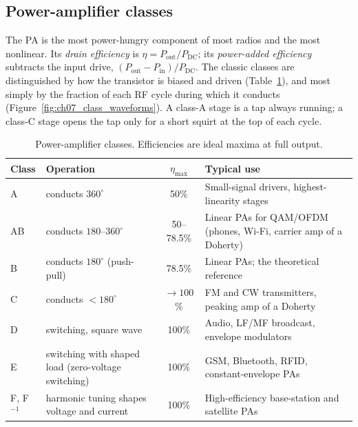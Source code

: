 
\subsection{Power-amplifier classes}

The PA is the most power-hungry component of most radios and the most nonlinear. Its \emph{drain
efficiency} is $\eta=P_{\text{out}}/P_{\text{DC}}$; its \emph{power-added efficiency} subtracts the input
drive, $(P_{\text{out}}-P_{\text{in}})/P_{\text{DC}}$. The classic classes are distinguished by how the
transistor is biased and driven (Table~\ref{tab:ch07:paclasses}), and most simply by the fraction of
each RF cycle during which it conducts (Figure~\ref{fig:ch07_class_waveforms}). A class-A stage is a
tap always running; a class-C stage opens the tap only for a short squirt at the top of each cycle.


\begin{table}[htbp]\centering\small
\caption{Power-amplifier classes. Efficiencies are ideal maxima at full output.}
\label{tab:ch07:paclasses}
\begin{tabular}{l>{\raggedright\arraybackslash}p{2.5cm}c>{\raggedright\arraybackslash}p{5.6cm}}
\toprule
Class & Operation & $\eta_{\max}$ & Typical use \\
\midrule
A & conducts $360^\circ$ & 50\% & Small-signal drivers, highest-linearity stages \\
AB & conducts $180$--$360^\circ$ & 50--78.5\% & Linear PAs for QAM/OFDM (phones, Wi-Fi, carrier amp of a Doherty) \\
B & conducts $180^\circ$ (push-pull) & 78.5\% & Linear PAs; the theoretical reference \\
C & conducts $<180^\circ$ & $\to100$\% & FM and CW transmitters, peaking amp of a Doherty \\
D & switching, square wave & 100\% & Audio, LF/MF broadcast, envelope modulators \\
E & switching with shaped load (zero-voltage switching) & 100\% & GSM, Bluetooth, RFID, constant-envelope PAs \\
F, F$^{-1}$ & harmonic tuning shapes voltage and current & 100\% & High-efficiency base-station and satellite PAs \\
\bottomrule
\end{tabular}
\end{table}

